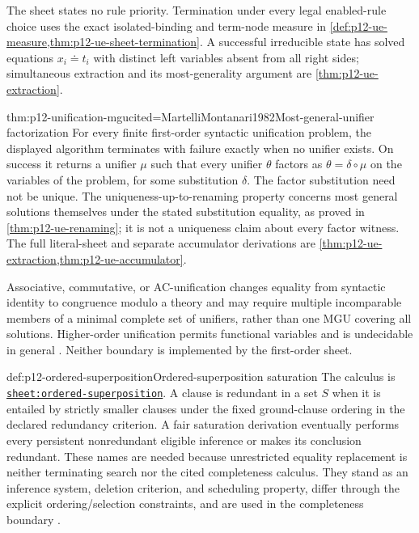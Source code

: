 The sheet states no rule priority. Termination under every legal enabled-rule
choice uses the exact isolated-binding and term-node measure in
\cref{def:p12-ue-measure,thm:p12-ue-sheet-termination}. A successful
irreducible state has solved equations \(x_i\doteq t_i\) with distinct
left variables absent from all right sides; simultaneous extraction and its
most-generality argument are \cref{thm:p12-ue-extraction}.

\begin{hbtheorem}{thm:p12-unification-mgu}{cited=MartelliMontanari1982}{Most-general-unifier factorization}
For every finite first-order syntactic unification problem, the displayed
algorithm terminates with failure exactly when no unifier exists. On success it
returns a unifier \(\mu\) such that every unifier \(\theta\) factors as
\(\theta=\delta\circ\mu\) on the variables of the problem, for some
substitution \(\delta\). The factor substitution need not be unique.
The uniqueness-up-to-renaming property concerns most general solutions
themselves under the stated substitution equality, as proved in
\cref{thm:p12-ue-renaming}; it is not a uniqueness claim about every
factor witness. The full literal-sheet and separate accumulator derivations
are \cref{thm:p12-ue-extraction,thm:p12-ue-accumulator}.
\end{hbtheorem}

Associative, commutative, or AC-unification changes equality from syntactic
identity to congruence modulo a theory and may require multiple incomparable
members of a minimal complete set of unifiers, rather than one MGU covering
all solutions.
Higher-order unification permits functional variables and is undecidable in
general \cite{Goldfarb1981}. Neither boundary is implemented by the first-order
sheet.

\begin{hbdefinition}{def:p12-ordered-superposition}{Ordered-superposition saturation}
The calculus is
\hyperref[sheet:ordered-superposition]{\texttt{sheet:ordered-superposition}}.
A clause is redundant in a set \(S\) when it is entailed by strictly smaller
clauses under the fixed ground-clause ordering in the declared redundancy
criterion. A fair saturation derivation eventually performs every persistent
nonredundant eligible inference or makes its conclusion redundant. These names
are needed because unrestricted equality replacement is neither terminating
search nor the cited completeness calculus. They stand as an inference system,
deletion criterion, and scheduling property, differ through the explicit
ordering/selection constraints, and are used in the completeness boundary
\cite{BachmairGanzinger2001,NieuwenhuisRubio2001}.
\end{hbdefinition}


